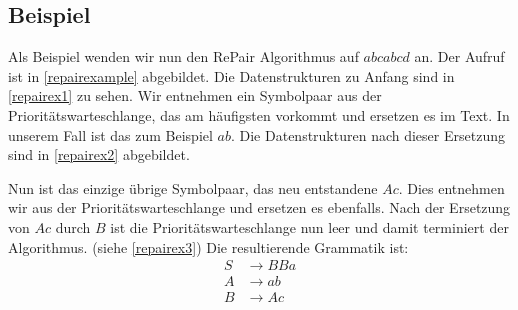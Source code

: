 \subsection{Beispiel}

Als Beispiel wenden wir nun den RePair Algorithmus auf $abcabcd$ an. Der Aufruf ist in \autoref{repairexample} abgebildet. Die Datenstrukturen zu Anfang sind in \autoref{repairex1} zu sehen.
Wir entnehmen ein Symbolpaar aus der Prioritätswarteschlange, das am häufigsten vorkommt und ersetzen es im Text. In unserem Fall ist das zum Beispiel $ab$. Die Datenstrukturen nach dieser Ersetzung sind in \autoref{repairex2} abgebildet.

Nun ist das einzige übrige Symbolpaar, das neu entstandene $Ac$. Dies entnehmen wir aus der Prioritätswarteschlange und ersetzen es ebenfalls.
Nach der Ersetzung von $Ac$ durch $B$ ist die Prioritätswarteschlange nun leer und damit terminiert der Algorithmus. (siehe \autoref{repairex3}) Die resultierende Grammatik ist:
\begin{align*}
	S &\rightarrow BBa\\
	A &\rightarrow ab\\
	B &\rightarrow Ac
\end{align*}